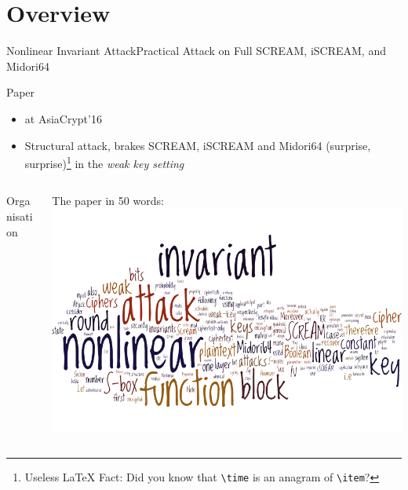 \section{Overview}
\begin{frame}{Nonlinear Invariant Attack}{Practical Attack on Full SCREAM, iSCREAM, and Midori64}
    \begin{block}{Paper}
        \begin{itemize}
            \item \textcite{AC16:TLS} at AsiaCrypt'16
            \item Structural attack, brakes SCREAM, iSCREAM and Midori64
                  (surprise, surprise)\footnote{Useless \LaTeX{} Fact: Did you know that \texttt{\textbackslash{}time} is an anagram of \texttt{\textbackslash{}item}?}
                  in the \emph{weak key setting}
        \end{itemize}
    \end{block}
    \vspace{-1em}
    \begin{columns}[T]
        \begin{column}{0.45\textwidth}
            \begin{block}{Organisation}
                \vspace{0.5em}
                \tableofcontents
            \end{block}
        \end{column}
        \begin{column}{0.45\textwidth}
            \begin{block}{The paper in 50 words:}
                \centering
                \includegraphics[keepaspectratio,width=\textwidth]{data/wordle.png}
            \end{block}
        \end{column}
    \end{columns}
\end{frame}

